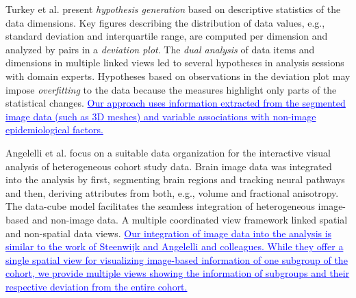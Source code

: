 \documentclass[journal]{style/vgtc} 			          %
\newcommand{\rem}[1]{\textcolor{red}{\sout{#1}}}
\newcommand{\add}[1]{\textcolor{blue}{\uline{#1}}}
\begin{document}
Turkey et al. \cite{Turkay2013} present \emph{hypothesis generation} based on descriptive statistics of the data dimensions.
%
Key figures describing the distribution of data values, e.g., standard deviation and interquartile range, are computed per dimension and analyzed by pairs in a \emph{deviation plot}.
%
%
The \emph{dual analysis} of data items and dimensions in multiple linked views led to several hypotheses in analysis sessions with domain experts.
%
Hypotheses based on observations in the deviation plot may impose \emph{overfitting} to the data because the measures highlight only parts of the statistical changes.
%
\add{Our approach uses information extracted from the segmented image data (such as 3D meshes) and variable associations with non-image epidemiological factors.}

Angelelli et al. \cite{Angelelli2014} focus on a suitable data organization for the interactive visual analysis of heterogeneous cohort study data.
%
%
Brain image data was integrated into the analysis by first, segmenting brain regions and tracking neural pathways and then, deriving attributes from both, e.g., volume and fractional anisotropy.
%
The data-cube model facilitates the seamless integration of heterogeneous image-based and non-image data.
%
A multiple coordinated view framework linked spatial and non-spatial data views.
%
%
\add{Our integration of image data into the analysis is similar to the work of Steenwijk \cite{Steenwijk2010} and Angelelli \cite{Angelelli2014} and colleagues.
%
While they offer a single spatial view for visualizing image-based information of one subgroup of the cohort, we provide multiple views showing the information of subgroups and their respective deviation from the entire cohort.}
%
\end{document}
